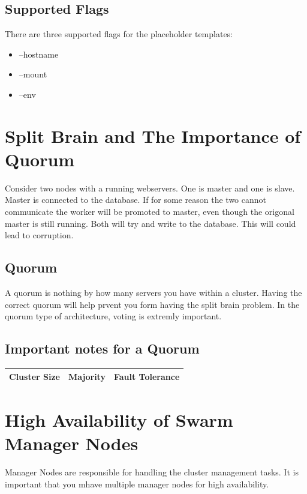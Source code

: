 \documentclass[11pt]{book}
\begin{document}
    \subsection{Supported Flags}
    There are three supported flags for the placeholder templates:
    \begin{itemize}
        \item --hostname
        \item --mount
        \item --env
    \end{itemize}



    \section{Split Brain and The Importance of Quorum}
    Consider two nodes with a running webservers. One is master and one is slave. Master is connected to the database.
    If for some reason the two cannot communicate the worker will be promoted to master, even though the origonal master is still running.
    Both will try and write to the database. This will could lead to corruption.

    \subsection{Quorum}
    A quorum is nothing by how many servers you have within a cluster.
    Having the correct quorum will help prvent you form having the split brain problem.
    In the quorum type of architecture, voting is extremly important.

    \subsection{Important notes for a Quorum}
    \begin{table}[ht]
        \centering
        \begin{tabular}{|c|c|c|}
            \hline
            Cluster Size & Majority & Fault Tolerance                                                           \\ \hline
        \end{tabular}
    \end{table}

    
    \section{High Availability of Swarm Manager Nodes}
    Manager Nodes are responsible for handling the cluster management tasks.
    It is important that you mhave multiple manager nodes for high availability.
\end{document}
